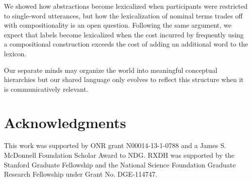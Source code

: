 \documentclass[10pt,letterpaper]{article}
\begin{document}

We showed how abstractions become lexicalized when participants were restricted to single-word utterances, but how the lexicalization of nominal terms trades off with compositionality is an open question. Following the same argument, we expect that labels become lexicalized when the cost incurred by frequently using a compositional construction exceeds the cost of adding an additional word to the lexicon. 

Our separate minds may organize the world into meaningful conceptual hierarchies but our shared language only evolves to reflect this structure when it is communicatively relevant. 


\section{\bf Acknowledgments}
\small
This work was supported by ONR grant N00014-13-1-0788 and a James S. McDonnell Foundation Scholar Award to NDG. RXDH was supported by the Stanford Graduate Fellowship and the National Science Foundation Graduate Research Fellowship under Grant No. DGE-114747.  



\setlength{\bibleftmargin}{.125in}
\setlength{\bibindent}{-\bibleftmargin}


\end{document}
